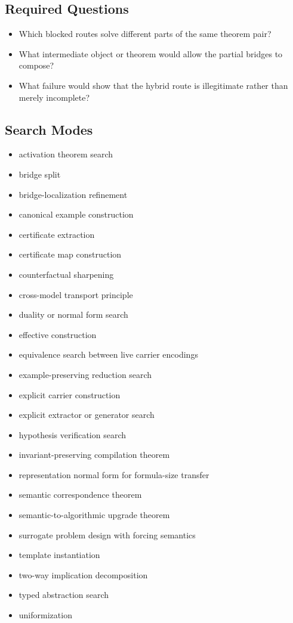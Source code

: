 \documentclass[11pt]{article}
\begin{document}
\subsection*{Required Questions}
\begin{itemize}[leftmargin=*,itemsep=0.2em]
\item Which blocked routes solve different parts of the same theorem pair?
\item What intermediate object or theorem would allow the partial bridges to compose?
\item What failure would show that the hybrid route is illegitimate rather than merely incomplete?
\end{itemize}
\subsection*{Search Modes}
\begin{itemize}[leftmargin=*,itemsep=0.2em]
\item activation theorem search
\item bridge split
\item bridge-localization refinement
\item canonical example construction
\item certificate extraction
\item certificate map construction
\item counterfactual sharpening
\item cross-model transport principle
\item duality or normal form search
\item effective construction
\item equivalence search between live carrier encodings
\item example-preserving reduction search
\item explicit carrier construction
\item explicit extractor or generator search
\item hypothesis verification search
\item invariant-preserving compilation theorem
\item representation normal form for formula-size transfer
\item semantic correspondence theorem
\item semantic-to-algorithmic upgrade theorem
\item surrogate problem design with forcing semantics
\item template instantiation
\item two-way implication decomposition
\item typed abstraction search
\item uniformization
\end{itemize}
\end{document}
